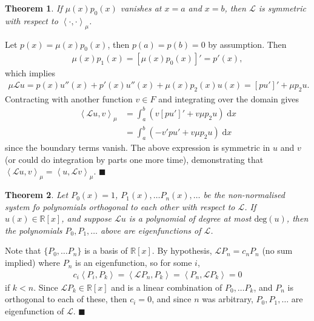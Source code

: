 \documentclass[letter-paper]{tufte-book}
\newtheorem{theorem}{\color{pastel-blue}Theorem}[section]
\newenvironment{proof}[1][Proof]{\begin{trivlist}
\item[\hskip \labelsep {\bfseries #1}]}{\end{trivlist}}
\newcommand{\inner}[2]{\left\langle #1, #2\right\rangle}
\newcommand{\qed}{\hfill$\blacksquare$}
\begin{document}
\begin{theorem}
  If $\mu(x) p_0(x)$ vanishes at $x=a$ and $x=b$, then $\mathcal{L}$ is symmetric with respect to $\inner{\cdot}{\cdot}_\mu$. 
\end{theorem}

\begin{proof}
  Let $p(x) = \mu(x) p_0(x)$, then $p(a) = p(b) = 0$ by assumption. Then
  \begin{align*}
    \mu(x) p_1(x) = [\mu(x) p_0(x)]' = p'(x),
  \end{align*}
  which implies
  \begin{align*}
    \mu\mathcal{L}u = p(x) u''(x) + p'(x) u''(x) + \mu(x) p_2(x) u(x) = [pu']' + \mu p_2 u.
  \end{align*}
  Contracting with another function $v \in F$ and integrating over the domain gives
  \begin{align*}
    \inner{\mathcal{L}u}{v}_\mu
      &= \int_a^b \left(v[pu']' + v\mu p_2 u\right)\; \mathrm{d}x\\
      &= \int_a^b \left(-v'pu' + v\mu p_2 u\right)\; \mathrm{d}x
  \end{align*}
  since the boundary terms vanish. The above expression is symmetric in $u$ and $v$ (or could do integration by parts one more time), demonstrating that $\inner{\mathcal{L}u}{v}_\mu = \inner{u}{\mathcal{L}v}_\mu$. \qed
\end{proof}

\begin{theorem}
  Let $P_0(x) = 1$, $P_1(x),\ldots P_n(x), \ldots$ be the non-normalised system fo polynomials orthogonal to each other with respect to $\mathcal{L}$. If $u(x) \in \mathbb{R}[x]$, and suppose $\mathcal{L}u$ is a polynomial of degree at most $\mbox{deg}(u)$, then the polynomials $P_0, P_1,\ldots$ above are eigenfunctions of $\mathcal{L}$.
\end{theorem}

\begin{proof}
  Note that $\{P_0, \ldots P_n\}$ is a basis of $\mathbb{R}[x]$. By hypothesis, $\mathcal{L}P_n = c_n P_n$ (no sum implied) where $P_n$ is an eigenfunction, so for some $i$,
  \begin{align*}
    c_i \inner{P_i}{P_k} = \inner{\mathcal{L}P_n}{P_k} = \inner{P_n}{\mathcal{L}P_k} = 0
  \end{align*}
  if $k < n$. Since $\mathcal{L}P_k \in \mathbb{R}[x]$ and is a linear combination of $P_0, \ldots P_k$, and $P_n$ is orthogonal to each of these, then $c_i=0$, and since $n$ was arbitrary, $P_0, P_1,\ldots$ are eigenfunction of $\mathcal{L}$. \qed
\end{proof}
\end{document}
